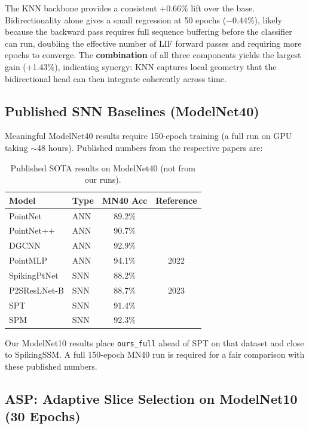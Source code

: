 \documentclass[11pt,a4paper]{article}
\begin{document}
The KNN backbone provides a consistent +0.66\% lift over the base. Bidirectionality
alone gives a small regression at 50 epochs ($-0.44$\%), likely because the
backward pass requires full sequence buffering before the classifier can run,
doubling the effective number of LIF forward passes and requiring more epochs
to converge. The \textbf{combination} of all three components yields the largest
gain (+1.43\%), indicating synergy: KNN captures local geometry that the
bidirectional head can then integrate coherently across time.

\subsection{Published SNN Baselines (ModelNet40)}

Meaningful ModelNet40 results require 150-epoch training (a full run on GPU
taking $\sim$48 hours). Published numbers from the respective papers are:

\begin{table}[H]
  \centering
  \caption{Published SOTA results on ModelNet40 (not from our runs).}
  \label{tab:mn40_pub}
  \begin{tabular}{llcc}
    \toprule
    \textbf{Model} & \textbf{Type} & \textbf{MN40 Acc} & \textbf{Reference} \\
    \midrule
    PointNet       & ANN & 89.2\% & \cite{qi2017} \\
    PointNet++     & ANN & 90.7\% & \cite{qi2017} \\
    DGCNN          & ANN & 92.9\% & \cite{dgcnn} \\
    PointMLP       & ANN & 94.1\% & 2022 \\
    \midrule
    SpikingPtNet   & SNN & 88.2\% & \cite{spiking_ptnet} \\
    P2SResLNet-B   & SNN & 88.7\% & 2023 \\
    SPT            & SNN & 91.4\% & \cite{spt} \\
    SPM            & SNN & 92.3\% & \cite{spm2025} \\
    \bottomrule
  \end{tabular}
\end{table}

Our ModelNet10 results place \texttt{ours\_full} ahead of SPT on that dataset
and close to SpikingSSM. A full 150-epoch MN40 run is required for a fair
comparison with these published numbers.

\subsection{ASP: Adaptive Slice Selection on ModelNet10 (30 Epochs)}
\label{sec:asp_results}
\end{document}
